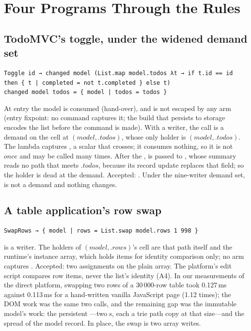 \section{Four Programs Through the Rules}
\label{app:examples}

\subsection{TodoMVC's toggle, under the widened demand set}

\begin{Verbatim}
Toggle id → changed model (List.map model.todos λt → if t.id == id then { t | completed = not t.completed } else t)
changed model todos = { model | todos = todos }
\end{Verbatim}
At entry the model is consumed (hand-over), and  is not escaped by any arm (entry
fixpoint: no command captures it; the build that persists to storage encodes the list before the command
is made). With  a writer, the call is a demand on the cell at $(\mathit{model}, .\mathit{todos})$,
whose only holder is $(\mathit{model}, .\mathit{todos})$. The lambda captures , a scalar that
crosses; it consumes nothing, so it is not $\mathit{once}$ and may be called many times. After the
,  is passed to , whose summary reads no path that meets
$.\mathit{todos}$, because its record update replaces that field; so the holder is dead at the demand.
Accepted: . Under the nine-writer demand set,  is not a demand and nothing
changes.

\subsection{A table application's row swap}

\begin{Verbatim}
SwapRows → { model | rows = List.swap model.rows 1 998 }
\end{Verbatim}
 is a writer. The holders of $(\mathit{model}, .\mathit{rows})$'s cell are that path itself and
the runtime's instance array, which holds items for identity comparison only; no arm captures .
Accepted: two assignments on the plain array. The platform's edit script compares row items, never the
list's identity (A4). In our measurements of the direct platform, swapping two rows of a 30\,000-row
table took 0.127\,ms against 0.113\,ms for a hand-written vanilla JavaScript page (1.12 times); the DOM
work was the same two  calls, and the remaining gap was the immutable model's work: the persistent
---two s, each a trie path copy at that size---and the spread of the model
record. In place, the swap is two array writes.

